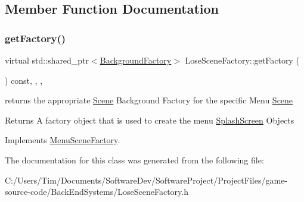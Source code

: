 \subsection{Member Function Documentation}
\mbox{\label{class_lose_scene_factory_adfe18ba674cdd988bb78e3cd3218796f}} 
\subsubsection{\texorpdfstring{get\+Factory()}{getFactory()}}
{\footnotesize\ttfamily virtual std\+::shared\+\_\+ptr$<$\hyperlink{class_background_factory}{Background\+Factory}$>$ Lose\+Scene\+Factory\+::get\+Factory (\begin{DoxyParamCaption}{ }\end{DoxyParamCaption}) const\hspace{0.3cm}{\ttfamily [inline]}, {\ttfamily [override]}, {\ttfamily [protected]}, {\ttfamily [virtual]}}



returns the appropriate \hyperlink{class_scene}{Scene} Background Factory for the specific Menu \hyperlink{class_scene}{Scene} 

\begin{DoxyReturn}{Returns}
A factory object that is used to create the menu \hyperlink{class_splash_screen}{Splash\+Screen} Objects 
\end{DoxyReturn}


Implements \hyperlink{class_menu_scene_factory_ad0f60a16fdbb10c6d7ba3311dafa2e76}{Menu\+Scene\+Factory}.



The documentation for this class was generated from the following file\+:\begin{DoxyCompactItemize}
\item 
C\+:/\+Users/\+Tim/\+Documents/\+Software\+Dev/\+Software\+Project/\+Project\+Files/game-\/source-\/code/\+Back\+End\+Systems/Lose\+Scene\+Factory.\+h\end{DoxyCompactItemize}
